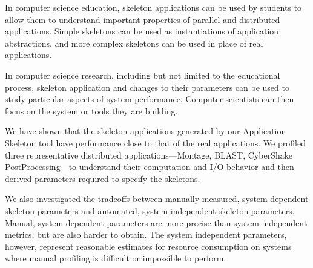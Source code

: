 \documentclass[preprint,12pt]{elsarticle}
\newcommand{\katznote}[1]{ {\textcolor{blue}    { ***Dan:   #1 }}}
\newcommand{\zhaonote}[1]{{\textcolor{cyan}{ ***Zhao:  #1 }}}
\newcommand{\katznote}[1]{}
\newcommand{\zhaonote}[1]{}
\begin{document}
In computer science education, skeleton applications can be used by students to allow them to understand important properties of parallel and distributed applications.  Simple skeletons can be used as instantiations of application abstractions, and more complex skeletons can be used in place of real applications.

In computer science research, including but not limited to the educational process,
skeleton application and changes to their parameters can be used to
study particular aspects of system performance.
Computer scientists can then focus on the system or tools they are building.

We have shown that the skeleton applications generated by our Application Skeleton tool have performance close to that of the real applications.  We profiled three representative distributed applications---Montage, BLAST, CyberShake PostProcessing---to understand their computation and I/O behavior and then derived parameters required to specify
the skeletons.  

We also investigated the tradeoffs between manually-measured, system dependent
skeleton parameters and automated, system independent skeleton
parameters. Manual, system dependent parameters are more precise than system
independent metrics, but are also harder to obtain.  The system independent
parameters, however, represent reasonable estimates for resource consumption on
systems where manual profiling is difficult or impossible to perform.

\end{document}
